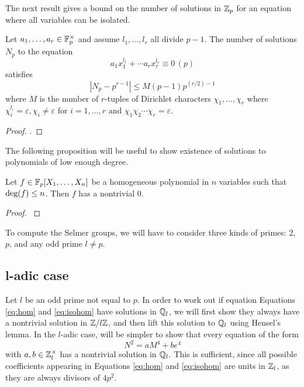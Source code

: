 \documentclass[12pt, a4paper]{report}
\begin{document}
The next result gives a bound on the number of solutions in ${\mathbb Z}_p$ for an equation
where all variables can be isolated.

\begin{prop} \label{prop:countsols}
  Let $a_1, \dots, a_r \in \mathbb{F}_p^\times$ and assume $l_1, \dots, l_r$ all divide
  $p-1$.
  The number of solutions $N_p$ to the equation
  \[a_1x_1^{l_1} + \cdots a_rx_r^{l_r} \equiv 0 \, (p)\]
  satisfies
  \begin{equation} 
    |N_p - p^{r-1}| \leq M(p-1)p^{(r/2)-1}
  \end{equation} 
  where $M$ is the number of $r$-tuples
  of Dirichlet characters
  $\chi_1, \dots , \chi_r$
  where $\chi_i^{l_i} = \varepsilon, \chi_i \neq \varepsilon$ for
  $i = 1, \dots, r$ and $\chi_1 \chi_2 \cdots \chi_r = \varepsilon$.
\end{prop} 
\begin{proof}
  \cite[See][Chapter 8-7, page 103]{classical}.
\end{proof}

The following proposition will be useful to show existence of solutions
to polynomials of low enough degree.

\begin{prop}
  Let $f \in \mathbb{F}_p[X_1, \dots , X_n]$ be a homogeneous polynomial
  in $n$ variables such that $\textnormal{deg}(f) \leq n$. Then $f$ has a nontrivial 0.
\end{prop}

\begin{proof}
  \cite[See][Chapter 1, page 5]{Serre}
\end{proof}

To compute the Selmer groups, we will have to consider three
kinds of primes: 2, $p$, and any odd prime $l \neq p$.

\subsection{l-adic case}

Let $l$ be an odd prime not equal to $p$.
In order to work out if equation Equations \ref{eq:hom} and \ref{eq:isohom} have
solutions in ${\mathbb Q}_l$,
we will first show they always have a nontrivial solution 
in ${\mathbb Z}/l{\mathbb Z}$, and then lift this solution to ${\mathbb Q}_l$ using Hensel's lemma.
In the $l$-adic case, will be simpler to show that every equation of the form
\begin{equation} \label{eq:genhom}
N^2 = aM^4 + be^4
\end{equation}
with $a,b \in {\mathbb Z}_l^\times$ has a nontrivial solution in ${\mathbb Q}_l.$ This is
sufficient, since all
possible coefficients appearing in Equations \ref{eq:hom} and \ref{eq:isohom}
are units in ${\mathbb Z}_l$, as they are always divisors of $4p^2$.
\end{document}
